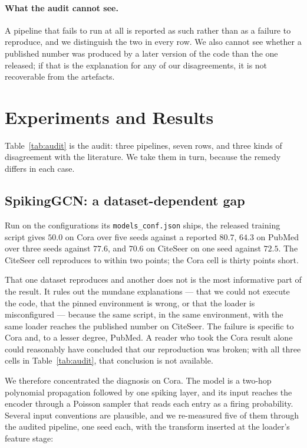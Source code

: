 \documentclass[10pt,twocolumn]{article}
\newcommand{\tabref}[1]{Table~\ref{#1}}
\begin{document}
\paragraph{What the audit cannot see.} A pipeline that fails to run at all is reported as such rather
than as a failure to reproduce, and we distinguish the two in every row. We also cannot see whether a
published number was produced by a later version of the code than the one released; if that is the
explanation for any of our disagreements, it is not recoverable from the artefacts.
\section{Experiments and Results}
\label{sec:results}


\tabref{tab:audit} is the audit: three pipelines, seven rows, and three kinds of disagreement with the
literature. We take them in turn, because the remedy differs in each case.

\subsection{SpikingGCN: a dataset-dependent gap}
\label{sec:sgcn}

Run on the configurations its \texttt{models\_conf.json} ships, the released training script gives
$50.0$ on Cora over five seeds against a reported $80.7$, $64.3$ on PubMed over three seeds against
$77.6$, and $70.6$ on CiteSeer on one seed against $72.5$. The CiteSeer cell reproduces to within two
points; the Cora cell is thirty points short.

That one dataset reproduces and another does not is the most informative part of the result. It rules
out the mundane explanations --- that we could not execute the code, that the pinned environment is
wrong, or that the loader is misconfigured --- because the same script, in the same environment, with
the same loader reaches the published number on CiteSeer. The failure is specific to Cora and, to a
lesser degree, PubMed. A reader who took the Cora result alone could reasonably have concluded that
our reproduction was broken; with all three cells in \tabref{tab:audit}, that conclusion is not
available.

We therefore concentrated the diagnosis on Cora. The model is a two-hop polynomial propagation
followed by one spiking layer, and its input reaches the encoder through a Poisson sampler that
reads each entry as a firing probability. Several input conventions are plausible, and we
re-measured five of them through the audited pipeline, one seed each, with the transform inserted at
the loader's feature stage:
\end{document}
